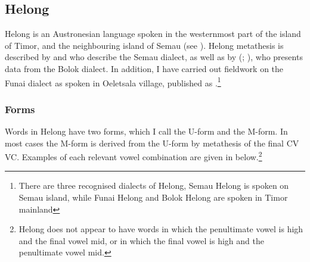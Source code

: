 \subsection{Helong}\label{sec:Hel}
Helong is an Austronesian language spoken in the westernmost part of the island of Timor,
and the neighbouring island of Semau (see ).
Helong metathesis is described by \citet{baca12} and \citet{ba15,ba17b}
who describe the Semau dialect,
as well as by \citeauthor{st96b} (\citeyear{st96b}; \citeyear{st08}),
who presents data from the Bolok dialect.
In addition, I have carried out fieldwork on the Funai dialect
as spoken in Oeletsala village, published as \cite{ed18c}.\footnote{
		There are three recognised dialects of Helong,
		Semau Helong is spoken on Semau island, while Funai
		Helong and Bolok Helong are spoken in Timor mainland}

\subsubsection{Forms}\label{sec:HelFor}
Words in Helong have two forms,
which I call the U-form and the M-form.
In most cases the M-form is derived from the U-form
by metathesis of the final CV {\ra} VC.
Examples of each relevant vowel combination are given in  below.\footnote{
		Helong does not appear to have words in which the penultimate vowel
		is high and the final vowel mid,
		or in which the final vowel is high and the penultimate vowel mid.}

\begin{exe}
	\label{ex:VCV->VVC-Hel}
\end{exe}

